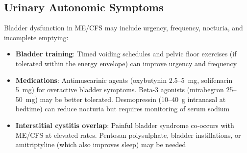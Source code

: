 \subsection{Urinary Autonomic Symptoms}

Bladder dysfunction in ME/CFS may include urgency, frequency, nocturia, and incomplete emptying:

\begin{itemize}
    \item \textbf{Bladder training}: Timed voiding schedules and pelvic floor exercises (if tolerated within the energy envelope) can improve urgency and frequency
    \item \textbf{Medications}: Antimuscarinic agents (oxybutynin 2.5--5~mg, solifenacin 5~mg) for overactive bladder symptoms. Beta-3 agonists (mirabegron 25--50~mg) may be better tolerated. Desmopressin (10--40~\textmu g intranasal at bedtime) can reduce nocturia but requires monitoring of serum sodium
    \item \textbf{Interstitial cystitis overlap}: Painful bladder syndrome co-occurs with ME/CFS at elevated rates. Pentosan polysulphate, bladder instillations, or amitriptyline (which also improves sleep) may be needed
\end{itemize}

